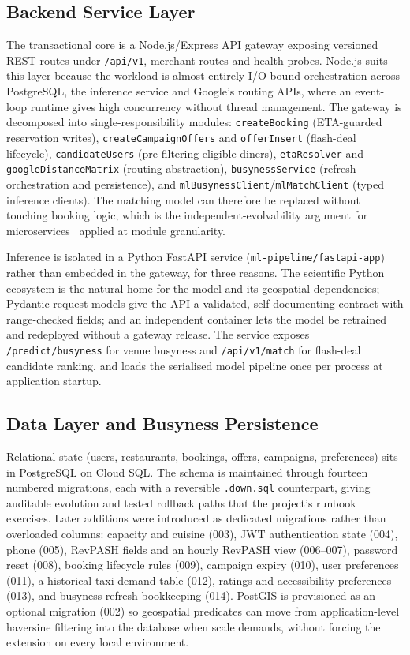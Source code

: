 \documentclass[conference]{IEEEtran}
\begin{document}
\subsection{Backend Service Layer}

The transactional core is a Node.js/Express API gateway exposing versioned REST routes under \texttt{/api/v1}, merchant routes and health probes. Node.js suits this layer because the workload is almost entirely I/O-bound orchestration across PostgreSQL, the inference service and Google's routing APIs, where an event-loop runtime gives high concurrency without thread management. The gateway is decomposed into single-responsibility modules: \texttt{createBooking} (ETA-guarded reservation writes), \texttt{createCampaignOffers} and \texttt{offerInsert} (flash-deal lifecycle), \texttt{candidateUsers} (pre-filtering eligible diners), \texttt{etaResolver} and \texttt{googleDistanceMatrix} (routing abstraction), \texttt{busynessService} (refresh orchestration and persistence), and \texttt{mlBusynessClient}/\texttt{mlMatchClient} (typed inference clients). The matching model can therefore be replaced without touching booking logic, which is the independent-evolvability argument for microservices~\cite{b7} applied at module granularity.

Inference is isolated in a Python FastAPI service (\texttt{ml-pipeline/fastapi-app}) rather than embedded in the gateway, for three reasons. The scientific Python ecosystem is the natural home for the model and its geospatial dependencies; Pydantic request models give the API a validated, self-documenting contract with range-checked fields; and an independent container lets the model be retrained and redeployed without a gateway release. The service exposes \texttt{/predict/busyness} for venue busyness and \texttt{/api/v1/match} for flash-deal candidate ranking, and loads the serialised model pipeline once per process at application startup.

\subsection{Data Layer and Busyness Persistence}

Relational state (users, restaurants, bookings, offers, campaigns, preferences) sits in PostgreSQL on Cloud SQL. The schema is maintained through fourteen numbered migrations, each with a reversible \texttt{.down.sql} counterpart, giving auditable evolution and tested rollback paths that the project's runbook exercises. Later additions were introduced as dedicated migrations rather than overloaded columns: capacity and cuisine (003), JWT authentication state (004), phone (005), RevPASH fields and an hourly RevPASH view (006--007), password reset (008), booking lifecycle rules (009), campaign expiry (010), user preferences (011), a historical taxi demand table (012), ratings and accessibility preferences (013), and busyness refresh bookkeeping (014). PostGIS is provisioned as an optional migration (002) so geospatial predicates can move from application-level haversine filtering into the database when scale demands, without forcing the extension on every local environment.
\end{document}
